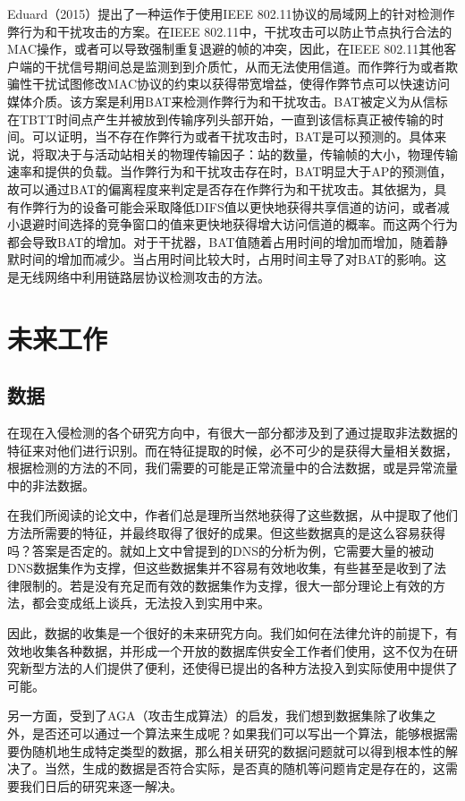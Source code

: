 \documentclass[11pt]{article} %
\begin{document}
Eduard（2015）提出了一种运作于使用IEEE 802.11协议的局域网上的针对检测作弊行为和干扰攻击的方案。在IEEE 802.11中，干扰攻击可以防止节点执行合法的MAC操作，或者可以导致强制重复退避的帧的冲突，因此，在IEEE 802.11其他客户端的干扰信号期间总是监测到到介质忙，从而无法使用信道。而作弊行为或者欺骗性干扰试图修改MAC协议的约束以获得带宽增益，使得作弊节点可以快速访问媒体介质。该方案是利用BAT来检测作弊行为和干扰攻击。BAT被定义为从信标在TBTT时间点产生并被放到传输序列头部开始，一直到该信标真正被传输的时间。可以证明，当不存在作弊行为或者干扰攻击时，BAT是可以预测的。具体来说，将取决于与活动站相关的物理传输因子：站的数量，传输帧的大小，物理传输速率和提供的负载。当作弊行为和干扰攻击存在时，BAT明显大于AP的预测值，故可以通过BAT的偏离程度来判定是否存在作弊行为和干扰攻击。其依据为，具有作弊行为的设备可能会采取降低DIFS值以更快地获得共享信道的访问，或者减小退避时间选择的竞争窗口的值来更快地获得增大访问信道的概率。而这两个行为都会导致BAT的增加。对于干扰器，BAT值随着占用时间的增加而增加，随着静默时间的增加而减少。当占用时间比较大时，占用时间主导了对BAT的影响。这是无线网络中利用链路层协议检测攻击的方法。

\section{未来工作}
\label{future}

\subsection{数据}
\label{data}

在现在入侵检测的各个研究方向中，有很大一部分都涉及到了通过提取非法数据的特征来对他们进行识别。而在特征提取的时候，必不可少的是获得大量相关数据，根据检测的方法的不同，我们需要的可能是正常流量中的合法数据，或是异常流量中的非法数据。

在我们所阅读的论文中，作者们总是理所当然地获得了这些数据，从中提取了他们方法所需要的特征，并最终取得了很好的成果。但这些数据真的是这么容易获得吗？答案是否定的。就如上文中曾提到的DNS的分析为例，它需要大量的被动DNS数据集作为支撑，但这些数据集并不容易有效地收集，有些甚至是收到了法律限制的。若是没有充足而有效的数据集作为支撑，很大一部分理论上有效的方法，都会变成纸上谈兵，无法投入到实用中来。

因此，数据的收集是一个很好的未来研究方向。我们如何在法律允许的前提下，有效地收集各种数据，并形成一个开放的数据库供安全工作者们使用，这不仅为在研究新型方法的人们提供了便利，还使得已提出的各种方法投入到实际使用中提供了可能。

另一方面，受到了AGA（攻击生成算法）的启发，我们想到数据集除了收集之外，是否还可以通过一个算法来生成呢？如果我们可以写出一个算法，能够根据需要伪随机地生成特定类型的数据，那么相关研究的数据问题就可以得到根本性的解决了。当然，生成的数据是否符合实际，是否真的随机等问题肯定是存在的，这需要我们日后的研究来逐一解决。
\end{document}
